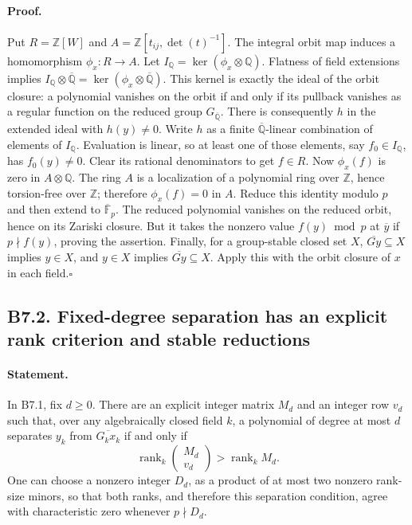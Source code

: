 \paragraph{Proof.}
Put $R=\mathbb Z[W]$ and
$A=\mathbb Z[t_{ij},\det(t)^{-1}]$.  The integral orbit map induces a
homomorphism $\phi_x:R\to A$.  Let
$I_{\mathbb Q}=\ker(\phi_x\otimes\mathbb Q)$.
Flatness of field extensions implies
$I_{\mathbb Q}\otimes\overline{\mathbb Q}
=\ker(\phi_x\otimes\overline{\mathbb Q})$.
This kernel is exactly the ideal of the orbit closure: a polynomial
vanishes on the orbit if and only if its pullback vanishes as a regular
function on the reduced group $G_{\overline{\mathbb Q}}$.
There is consequently $h$ in the extended ideal with $h(y)\neq0$.
Write $h$ as a finite $\overline{\mathbb Q}$-linear combination of
elements of $I_{\mathbb Q}$.  Evaluation is linear, so at least one of
those elements, say $f_0\in I_{\mathbb Q}$, has $f_0(y)\neq0$.
Clear its rational denominators to get $f\in R$.
Now $\phi_x(f)$ is zero in $A\otimes\mathbb Q$.
The ring $A$ is a localization of a polynomial ring over $\mathbb Z$,
hence torsion-free over $\mathbb Z$; therefore $\phi_x(f)=0$ in $A$.
Reduce this identity modulo $p$ and then extend to
$\overline{\mathbb F}_p$.  The reduced polynomial vanishes on the
reduced orbit, hence on its Zariski closure.  But it takes the nonzero
value $f(y)\bmod p$ at $\overline y$ if $p\nmid f(y)$, proving the
assertion.  Finally, for a group-stable closed set $X$,
$\overline{Gy}\subseteq X$ implies $y\in X$, and $y\in X$ implies
$\overline{Gy}\subseteq X$.  Apply this with the orbit closure of
$x$ in each field.\hfill$\square$

\subsection*{B7.2. Fixed-degree separation has an explicit rank criterion and stable reductions}
\paragraph{Statement.}
In B7.1, fix $d\geq0$.  There are an explicit integer matrix $M_d$
and an integer row $v_d$ such that, over any algebraically closed field
$k$, a polynomial of degree at most $d$ separates $y_k$ from
$\overline{G_kx_k}$ if and only if
\[
 \operatorname{rank}_k\begin{pmatrix}M_d\\v_d\end{pmatrix}
    >\operatorname{rank}_k M_d.                    \tag{B7.2}
\]
One can choose a nonzero integer $D_d$, as a product of at most two
nonzero rank-size minors, so that both ranks, and therefore this
separation condition, agree with characteristic zero whenever
$p\nmid D_d$.
